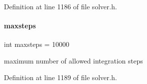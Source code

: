 Definition at line 1186 of file solver.\+h.

\mbox{\label{classamici_1_1_solver_a029415ebe024ac6281fd9f190aefb2ee}} 
\paragraph{\texorpdfstring{maxsteps}{maxsteps}}
{\footnotesize\ttfamily int maxsteps = 10000\hspace{0.3cm}{\ttfamily [protected]}}

maximum number of allowed integration steps 

Definition at line 1189 of file solver.\+h.

